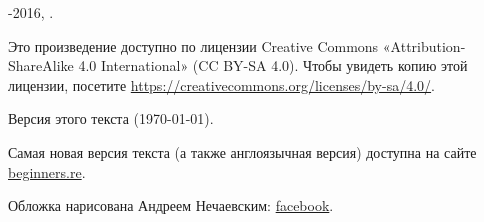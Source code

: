 ﻿\begin{titlepage}


\end{titlepage}

\newpage

\begin{center}
\vspace*{\fill}
{\LARGE \TITLE}

\vspace*{\fill}

{\large \AUTHOR}

{\large \TT{<\EMAIL>}}
\vspace*{\fill}
\vfill

\ccbysa

-2016, \AUTHOR. 

Это произведение доступно по лицензии Creative Commons «Attribution-ShareAlike 4.0 International» (CC BY-SA 4.0).
Чтобы увидеть копию этой лицензии, посетите \url{https://creativecommons.org/licenses/by-sa/4.0/}.

Версия этого текста ({\large \today}).

Самая новая версия текста (а также англоязычная версия) доступна на сайте \href{http://go.yurichev.com/17009}{beginners.re}.

Обложка нарисована Андреем Нечаевским: \href{http://go.yurichev.com/17023}{facebook}.

\end{center}
